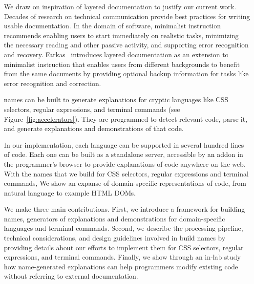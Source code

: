 We draw on inspiration of layered documentation to justify our current work. 
Decades of research on technical communication provide best practices for writing usable documentation.
In the domain of software, minimalist instruction~\cite{carroll_nurnberg_1990} recommends enabling users to start immediately on realistic tasks, minimizing the necessary  reading and other passive activity, and supporting error recognition and recovery.
Farkas~\cite{farkas_layering_1998} introduces layered documentation as an extension to minimalist instruction that enables users from different backgrounds to benefit from the same documents by providing optional backup information for tasks like error recognition and correction.
\fi 
%
\begin{changes}
\Glspl{name} can be built to generate explanations for cryptic languages like CSS selectors, regular expressions, and terminal commands (see Figure~\ref{fig:accelerators}). 
They are programmed to detect relevant code, parse it, and generate explanations and demonstrations of that code. 
\end{changes}
In our implementation, each language can be supported in several hundred lines of code.
Each one can be built as a standalone server, accessible by an addon in the programmer's browser to provide explanations of code anywhere on the web.
 With the \glspl{name} that we build for CSS selectors, regular expressions and terminal commands, \fi We show an expanse of domain-specific representations of code, from natural language to example HTML DOMs. 

We make three main contributions.
First, we introduce a framework for building \glspl{name}, generators of explanations and demonstrations for domain-specific languages and terminal commands.
Second, we describe the processing pipeline, technical considerations, and design guidelines involved in build \glspl{name} by providing details about our efforts to implement them for CSS selectors, regular expressions, and terminal commands. 
Finally, we show through an in-lab study how \gls{name}-generated explanations can help programmers modify existing code without referring to external documentation.
